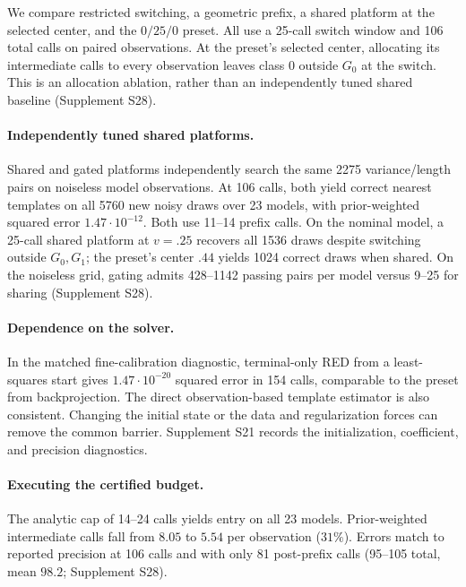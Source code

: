 We compare restricted switching, a geometric prefix, a shared
platform at the selected center, and the $0/25/0$ preset.
All use a 25-call switch window and 106 total calls on paired
observations. At the preset's selected center, allocating its
intermediate calls to every observation leaves class 0 outside $G_0$
at the switch. This is an allocation ablation, rather than an
independently tuned shared baseline (Supplement S28).

\paragraph{Independently tuned shared platforms.}
Shared and gated platforms independently search the same
2275 variance/length pairs on noiseless model observations.
At 106 calls, both yield correct nearest templates on all 5760
new noisy draws over 23 models, with prior-weighted squared
error $1.47\cdot10^{-12}$. Both use 11--14 prefix calls.
On the nominal model, a 25-call shared platform at $v=.25$
recovers all 1536 draws despite switching outside $G_0,G_1$;
the preset's center $.44$ yields 1024 correct draws when shared.
On the noiseless grid, gating admits 428--1142 passing pairs
per model versus 9--25 for sharing (Supplement S28).

\paragraph{Dependence on the solver.}
In the matched fine-calibration diagnostic, terminal-only RED
from a least-squares start gives $1.47\cdot10^{-20}$ squared error
in 154 calls, comparable to the preset from backprojection.
The direct observation-based template estimator is also consistent.
Changing the initial state or the data and regularization forces
can remove the common barrier. Supplement S21 records the
initialization, coefficient, and precision diagnostics.

\paragraph{Executing the certified budget.}
The analytic cap of 14--24 calls yields entry on all 23 models.
Prior-weighted intermediate calls fall from $8.05$ to $5.54$
per observation ($31\%$). Errors match to reported precision
at 106 calls and with only 81 post-prefix calls (95--105 total,
mean $98.2$; Supplement S28).

